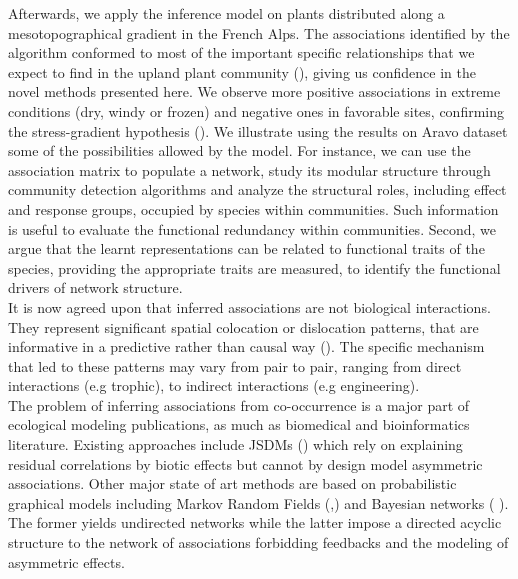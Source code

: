\documentclass[10pt,a4paper]{article}
\begin{document}
Afterwards, we apply the inference model on plants distributed along a mesotopographical gradient in the French Alps. The associations identified by the algorithm conformed to most of the important specific relationships that we expect to find in the upland plant community (\cite{choler2001facilitation}), giving us confidence in the novel methods presented here. We observe more positive associations in extreme conditions (dry, windy or frozen) and negative ones in favorable sites, confirming the stress-gradient hypothesis (\cite{callaway2002positive}). We illustrate using the results on Aravo dataset some of the possibilities allowed by the model. For instance, we can use the association matrix to populate a network, study its modular structure through community detection algorithms and analyze the structural roles, including effect and response groups, occupied by species within communities. Such information is useful to evaluate the functional redundancy within communities. Second, we argue that the learnt representations can be related to functional traits of the species, providing the appropriate traits are measured, to identify the functional drivers of network structure. \\

It is now agreed upon that inferred associations are not biological interactions. They represent significant spatial colocation or dislocation patterns, that are informative in a predictive rather than causal way (\cite{milns2010revealing}). The specific mechanism that led to these patterns may vary from pair to pair, ranging from direct interactions (e.g trophic), to indirect interactions (e.g engineering). \\

The problem of inferring associations from co-occurrence is a major part of ecological modeling publications, as much as biomedical and bioinformatics literature. Existing approaches include JSDMs (\cite{ovaskainen2017make}) which rely on explaining residual correlations by biotic effects but cannot by design model asymmetric associations. Other major state of art methods are based on probabilistic graphical models including Markov Random Fields (\cite{harris2016inferring},\cite{chiquet2018variational}) and Bayesian networks (\cite{trifonova2015spatio} \cite{aderhold2012hierarchical}). The former yields undirected networks while the latter impose a directed acyclic structure to the network of associations forbidding feedbacks and the modeling of asymmetric effects. \\
\end{document}
